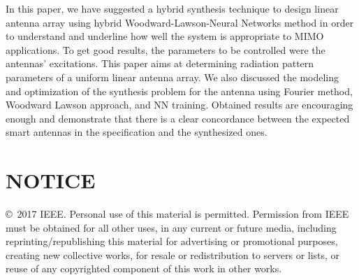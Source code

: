 \documentclass[conference]{IEEEtran}
\begin{document}
In this paper, we have suggested a hybrid synthesis technique to design linear antenna array using hybrid Woodward-Lawson-Neural Networks method in order to understand and underline how well the system is appropriate to MIMO applications. To get good results, the parameters to be controlled were the antennas' excitations. This paper aims at determining radiation pattern parameters of a uniform linear antenna array. We also discussed the modeling and optimization of the synthesis problem for the antenna using Fourier method, Woodward Lawson approach, and NN training. Obtained results are encouraging enough and demonstrate that there is a clear concordance between the expected smart antennas in the specification and the synthesized ones. 





\section*{NOTICE}
\copyright~2017 IEEE. Personal use of this material is permitted. Permission from IEEE must be obtained for all other uses, in any current or future media, including reprinting/republishing this material for advertising or promotional purposes, creating new collective works, for resale or redistribution to servers or lists, or reuse of any copyrighted component of this work in other works.
\end{document}

